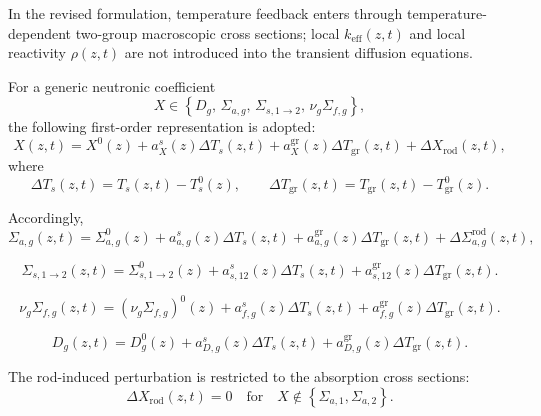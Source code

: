\documentclass[a4paper,12pt]{article}
\begin{document}
In the revised formulation, temperature feedback enters through
temperature-dependent two-group macroscopic cross sections; local
$k_{\mathrm{eff}}(z,t)$ and local reactivity $\rho(z,t)$ are not
introduced into the transient diffusion equations.

For a generic neutronic coefficient
\[
X
\in
\left\{
D_g,\,
\Sigma_{a,g},\,
\Sigma_{s,1\rightarrow 2},\,
\nu_g\Sigma_{f,g}
\right\},
\]
the following first-order representation is adopted:
\begin{equation}
X(z,t)
=
X^{0}(z)
+
a_{X}^{s}(z)\Delta T_s(z,t)
+
a_{X}^{\mathrm{gr}}(z)\Delta T_{\mathrm{gr}}(z,t)
+
\Delta X_{\mathrm{rod}}(z,t),
\label{eq:generic_xs_feedback}
\end{equation}
where
\begin{equation}
\Delta T_s(z,t)
=
T_s(z,t)-T_s^{0}(z),
\qquad
\Delta T_{\mathrm{gr}}(z,t)
=
T_{\mathrm{gr}}(z,t)-T_{\mathrm{gr}}^{0}(z).
\label{eq:temperature_perturbations}
\end{equation}

Accordingly,
\begin{equation}
\Sigma_{a,g}(z,t)
=
\Sigma_{a,g}^{0}(z)
+
a_{a,g}^{s}(z)\Delta T_s(z,t)
+
a_{a,g}^{\mathrm{gr}}(z)\Delta T_{\mathrm{gr}}(z,t)
+
\Delta\Sigma_{a,g}^{\mathrm{rod}}(z,t),
\label{eq:absorption_feedback}
\end{equation}

\begin{equation}
\Sigma_{s,1\rightarrow 2}(z,t)
=
\Sigma_{s,1\rightarrow 2}^{0}(z)
+
a_{s,12}^{s}(z)\Delta T_s(z,t)
+
a_{s,12}^{\mathrm{gr}}(z)\Delta T_{\mathrm{gr}}(z,t).
\label{eq:scattering_feedback}
\end{equation}

\begin{equation}
\nu_g\Sigma_{f,g}(z,t)
=
\left(\nu_g\Sigma_{f,g}\right)^{0}(z)
+
a_{f,g}^{s}(z)\Delta T_s(z,t)
+
a_{f,g}^{\mathrm{gr}}(z)\Delta T_{\mathrm{gr}}(z,t).
\label{eq:fission_feedback}
\end{equation}

\begin{equation}
D_g(z,t)
=
D_g^{0}(z)
+
a_{D,g}^{s}(z)\Delta T_s(z,t)
+
a_{D,g}^{\mathrm{gr}}(z)\Delta T_{\mathrm{gr}}(z,t).
\label{eq:diffusion_feedback}
\end{equation}

The rod-induced perturbation is restricted to the absorption cross
sections:
\begin{equation}
\Delta X_{\mathrm{rod}}(z,t)=0
\quad
\text{for}
\quad
X\notin
\left\{
\Sigma_{a,1},\Sigma_{a,2}
\right\}.
\label{eq:rod_only_absorption}
\end{equation}
\end{document}
